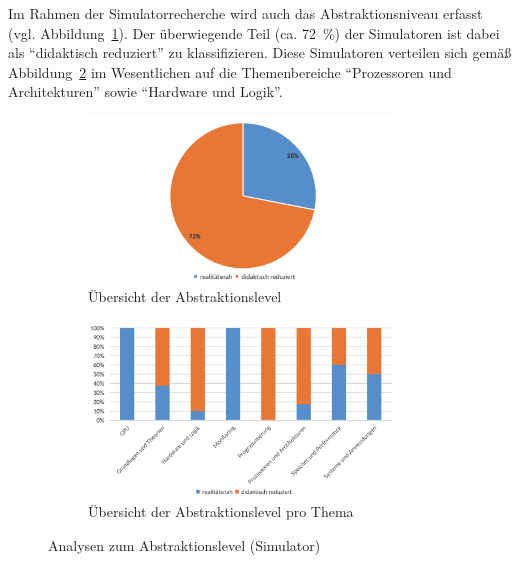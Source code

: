 Im Rahmen der Simulatorrecherche wird auch das Abstraktionsniveau erfasst (vgl. Abbildung~\ref{fig:5-abstraktion}). Der überwiegende Teil (ca. 72~\%) der Simulatoren ist dabei als \enquote{didaktisch reduziert} zu klassifizieren. Diese Simulatoren verteilen sich gemäß Abbildung~\ref{fig:6-abstraktion-thema} im Wesentlichen auf die Themenbereiche \enquote{Prozessoren und Architekturen} sowie \enquote{Hardware und Logik}.

\begin{figure}[!htbp]
    \centering
    \begin{subfigure}[b]{0.48\textwidth}
        \centering
        \includegraphics[width=0.90\textwidth]{graphics_sim/5-abstraktion.png}
        \caption{Übersicht der Abstraktionslevel}
        \label{fig:5-abstraktion}
    \end{subfigure}
    \hfill
    \begin{subfigure}[b]{0.48\textwidth}
        \centering
        \includegraphics[width=0.90\textwidth]{graphics_sim/6-abstraktion-thema.png}
        \caption{Übersicht der Abstraktionslevel pro Thema}
        \label{fig:6-abstraktion-thema}
    \end{subfigure}
    \caption{Analysen zum Abstraktionslevel (Simulator)}
    \label{fig:abstraktion-gesamt}
\end{figure}

